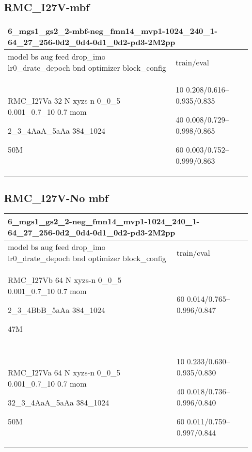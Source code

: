 \documentclass[,table,dvipsnames]{article}
\begin{document}
\subsection{RMC\_I27V-mbf}
\noindent\begin{tabular}{|p{10cm}|p{5cm}| }	
	\hline
	\multicolumn{2}{|p{15cm}|}{ 6\_mgs1\_gs2\_2-mbf-neg\_fmn14\_mvp1-1024\_240\_1-64\_27\_256-0d2\_0d4-0d1\_0d2-pd3-2M2pp }\\
	\hline
	model bs aug feed drop\_imo lr0\_drate\_depoch bnd optimizer block\_config & train/eval \\
	
	\rowcolor{red!20}
	RMC\_I27Va 32 N xyzs-n 0\_0\_5 0.001\_0.7\_10 0.7 mom\par 2\_3\_4AaA\_5aAa 384\_1024\par 50M& 
	10 0.208/0.616--0.935/0.835\par 40 0.008/0.729--0.998/0.865\par 60 0.003/0.752--0.999/0.863\\
	
	
	\hline 
\end{tabular}

\subsection{RMC\_I27V-No mbf}
\noindent\begin{tabular}{|p{10cm}|p{5cm}| }	
	\hline
	\multicolumn{2}{|p{15cm}|}{ 6\_mgs1\_gs2\_2-neg\_fmn14\_mvp1-1024\_240\_1-64\_27\_256-0d2\_0d4-0d1\_0d2-pd3-2M2pp }\\
	\hline
	model bs aug feed drop\_imo lr0\_drate\_depoch bnd optimizer block\_config & train/eval \\
	
	\rowcolor{red!20}
	RMC\_I27Vb 64 N xyzs-n 0\_0\_5 0.001\_0.7\_10 0.7 mom\par 2\_3\_4BbB\_5aAa 384\_1024\par 47M& 60 0.014/0.765--0.996/0.847\\
	
	\rowcolor{blue!20}\\
	RMC\_I27Va 64 N xyzs-n 0\_0\_5 0.001\_0.7\_10 0.7 mom\par 32\_3\_4AaA\_5aAa 384\_1024\par 50M & 10 0.233/0.630--0.935/0.830\par 40 0.018/0.736--0.996/0.840\par 60 0.011/0.759--0.997/0.844\\
	
	\hline 
\end{tabular}
\end{document}

